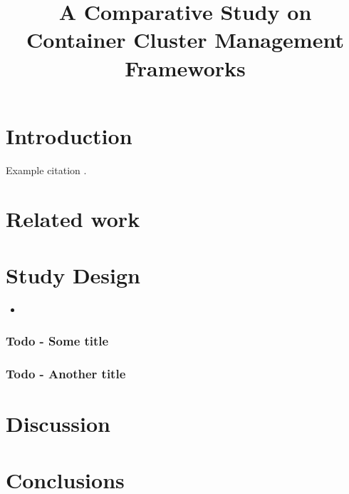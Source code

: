\documentclass{article}
\title{A Comparative Study on Container Cluster Management Frameworks}
\begin{document}
\maketitle

\begin{abstract}
\lipsum[1]
\end{abstract}

\section{Introduction}
Example citation \citep{db}. \lipsum[1]


\section{Related work}
\lipsum[1]

\section{Study Design}
\lipsum[1]
\begin{itemize}
\item \lipsum[1]
\end{itemize}

\subsubsection{Todo - Some title}
\lipsum[1]

\subsubsection{Todo - Another title}
\lipsum[1]


\section{Discussion}
\lipsum[1]

\section{Conclusions}
\lipsum[1]


\vspace{-7.5mm}
\renewcommand{\refname}{\section{References}}

\end{document}
